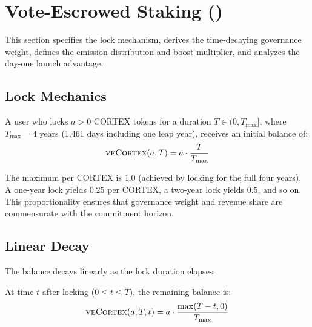 \section{Vote-Escrowed Staking (\texorpdfstring{\veCORTEX{}}{veCORTEX})}
\label{sec:vecortex-staking}

This section specifies the \veCORTEX{} lock mechanism, derives the
time-decaying governance weight, defines the emission distribution and boost
multiplier, and analyzes the day-one launch advantage.

\subsection{Lock Mechanics}
\label{subsec:lock-mechanics}

\begin{definition}
\label{def:vecortex}
A user who locks $a > 0$ CORTEX tokens for a duration $T \in (0, T_{\max}]$,
where $T_{\max} = 4$ years (1{,}461 days including one leap year), receives an
initial \veCORTEX{} balance of:
\begin{equation}
  \textsc{veCortex}(a, T) = a \cdot \frac{T}{T_{\max}}
  \label{eq:vecortex-initial}
\end{equation}
\end{definition}

The maximum \veCORTEX{} per CORTEX is $1.0$ (achieved by locking for the full
four years). A one-year lock yields $0.25$ \veCORTEX{} per CORTEX, a two-year
lock yields $0.5$, and so on. This proportionality ensures that governance
weight and revenue share are commensurate with the commitment horizon.

\subsection{Linear Decay}
\label{subsec:decay}

The \veCORTEX{} balance decays linearly as the lock duration elapses:

\begin{definition}
\label{def:vecortex-decay}
At time $t$ after locking ($0 \leq t \leq T$), the remaining \veCORTEX{}
balance is:
\begin{equation}
  \textsc{veCortex}(a, T, t) = a \cdot \frac{\max(T - t, 0)}{T_{\max}}
  \label{eq:vecortex-decay}
\end{equation}
\end{definition}

